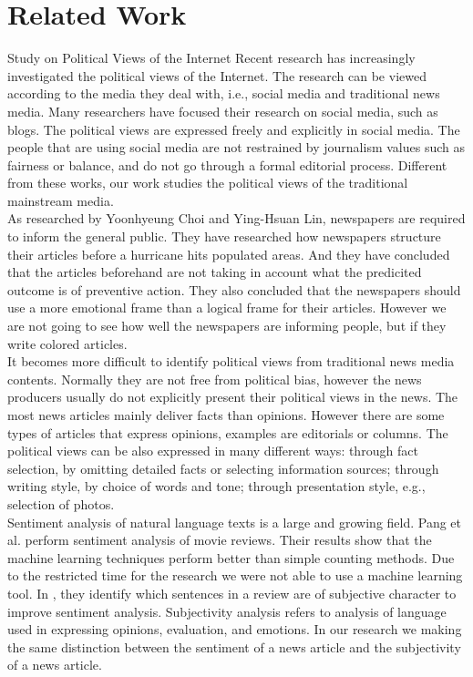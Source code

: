 \section{Related Work}
Study on Political Views of the Internet Recent research has increasingly investigated the political views of the Internet. The research can be viewed according to the media they deal with, i.e., social media and traditional news media. Many researchers have focused their research on social media, such as blogs\cite{research:blogpost}. The political views are expressed freely and explicitly in social media. The people that are using social media are not restrained by journalism values such as fairness or balance, and do not go through a formal editorial process. Different from these works, our work studies the political views of the traditional mainstream media. \\

As researched by Yoonhyeung Choi and Ying-Hsuan Lin\cite{hurricanes:newspaper}, newspapers are required to inform the general public. They have researched how newspapers structure their articles before a hurricane hits populated areas. And they have concluded that the articles beforehand are not taking in account what the predicited outcome is of preventive action. They also concluded that the newspapers should use a more emotional frame than a logical frame for their articles.
However we are not going to see how well the newspapers are informing people, but if they write colored articles. \\

It becomes more difficult to identify political views from traditional news media contents. Normally they are not free from political bias\cite{bias:newspaper}, however the news producers usually do not explicitly present their political views in the news. The most news articles mainly deliver facts than opinions. However there are some types of articles that express opinions, examples are editorials or columns. The political views can be also expressed in many different ways\cite{book:mediabias}: through fact selection, by omitting detailed facts or selecting information sources; through writing style, by choice of words and tone; through presentation style, e.g., selection of photos. \\

Sentiment analysis of natural language texts is a large and growing field. Pang et al. \cite{sentiment:machinelearning} perform sentiment analysis of movie reviews. Their results show that the machine learning techniques perform better than simple counting methods. Due to the restricted time for the research we were not able to use a machine learning tool. In \cite{sentiment:sentences}, they identify which sentences in a review are of subjective character to improve sentiment analysis. Subjectivity analysis refers to analysis of language used in expressing opinions, evaluation, and emotions. In our research we making the same distinction between the sentiment of a news article and the subjectivity of a news article. 